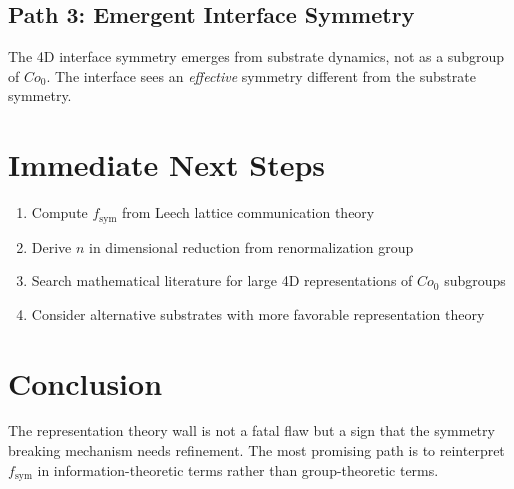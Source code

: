 \documentclass[11pt]{article}
\begin{document}
\subsection{Path 3: Emergent Interface Symmetry}
The 4D interface symmetry emerges from substrate dynamics, not as a subgroup of $Co_0$.
The interface sees an \emph{effective} symmetry different from the substrate symmetry.

\section{Immediate Next Steps}

\begin{enumerate}
\item Compute $f_{\text{sym}}$ from Leech lattice communication theory
\item Derive $n$ in dimensional reduction from renormalization group
\item Search mathematical literature for large 4D representations of $Co_0$ subgroups
\item Consider alternative substrates with more favorable representation theory
\end{enumerate}

\section{Conclusion}

The representation theory wall is not a fatal flaw but a sign that the
symmetry breaking mechanism needs refinement. The most promising path is
to reinterpret $f_{\text{sym}}$ in information-theoretic terms rather than
group-theoretic terms.
\end{document}
